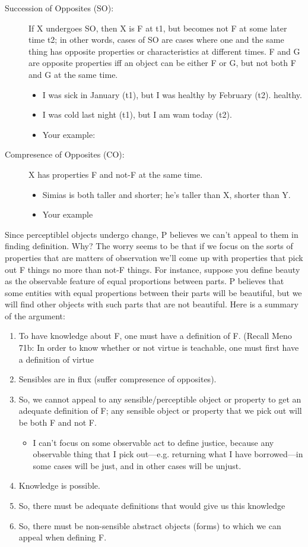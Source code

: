 \documentclass[oneside]{article}
\begin{document}
\begin{description}
\item[Succession of Opposites (SO):] If X undergoes SO, then X is F at t1, but
becomes not F at some later time t2; in other words, cases of SO are
cases where one and the same thing has opposite properties or
characteristics at different times. F and G are opposite properties iff an object can be either F or G, but not both F and G at the same time.
\begin{itemize}
\item I was sick in January (t1), but I was healthy by February (t2).
healthy. 
\item I was cold last night (t1), but I am wam today (t2). 
\item Your example:
\end{itemize}
\item[Compresence of Opposites (CO):] X has  properties F and not-F at the same time.
\begin{itemize}
\item Simias is both taller and shorter; he's taller than X, shorter than Y.
\item Your example
\end{itemize}
\end{description}
Since perceptiblel objects undergo change, P believes we can't appeal to them in finding definition. Why?  The worry seems to be that if we focus on the sorts of properties that are matters of observation we'll come up with properties that pick out F things no more than not-F things. For instance, suppose you define beauty as the observable feature of equal proportions between parts. P believes that some entities with equal propertions between their parts will be beautiful, but we will find other objects with such parts that are not beautiful. Here is a summary of the argument: 
\begin{enumerate}
\item  To have knowledge about F, one must have a definition of F. (Recall  Meno 71b: In order to know whether or not virtue is teachable,  one must first have a definition of virtue
\item  Sensibles are in flux  (suffer compresence of opposites).
\item  So, we cannot appeal to any sensible/perceptible object or property to get an adequate definition
  of F; any sensible object or property that we pick out will be both F  and not F.
\begin{itemize}
\item I can't focus on some observable act to define justice, because any observable
thing that I pick out---e.g. returning what I have borrowed---in some
cases will be just, and in other cases will be unjust.
\end{itemize}
\item Knowledge is possible.
\item  So, there must be adequate definitions that would give us this knowledge
\item So, there must be non-sensible abstract objects (forms) to which we can appeal when
  defining F.
\end{enumerate}
\end{document}
